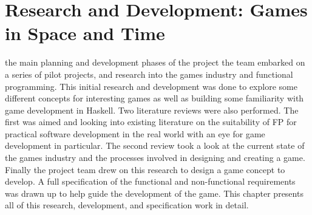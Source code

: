 \chapter[Research and Development: Games in Space and Time]{Research and Development: Games in Space and Time}
\label{ch:rd}


 the main planning and development phases of the project the team embarked on a series of pilot projects, and research into the games industry and functional programming. This initial research and development was done to explore some different concepts for interesting games as well as building some familiarity with game development in Haskell. Two literature reviews were also performed. The first was aimed and looking into existing literature on the suitability of FP for practical software development in the real world with an eye for game development in particular. The second review took a look at the current state of the games industry and the processes involved in designing and creating a game. Finally the project team drew on this research to design a game concept to develop. A full specification of the functional and non-functional requirements was drawn up to help guide the development of the game. This chapter presents all of this research, development, and specification work in detail.

\clearpage
\clearpage
\clearpage
\clearpage
